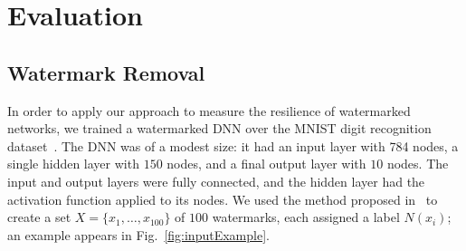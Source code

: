 \documentclass{easychair}
\newcommand{\relu}{\text{ReLU}\xspace{}}
\begin{document}
\section{Evaluation}
\label{sec:evaluation}

\subsection{Watermark Removal}

In order to apply our approach to measure the resilience of
watermarked networks, we trained a watermarked DNN over the MNIST
digit recognition dataset~\cite{mnist}. The DNN was of a modest size:
it had an input layer with 784 nodes, a single hidden layer with $150$
nodes, and a final output layer with $10$ nodes. The input and output layers were fully
connected, and the hidden layer had the \relu{} activation function
applied to its nodes. We used the
method proposed in~\cite{AdBaPiKeWatermarking} to create a set
$X=\{x_1,\ldots, x_{100}\}$ of $100$ watermarks, each assigned a label
$N(x_i)$; an example appears in Fig.~\ref{fig:inputExample}.
\end{document}
